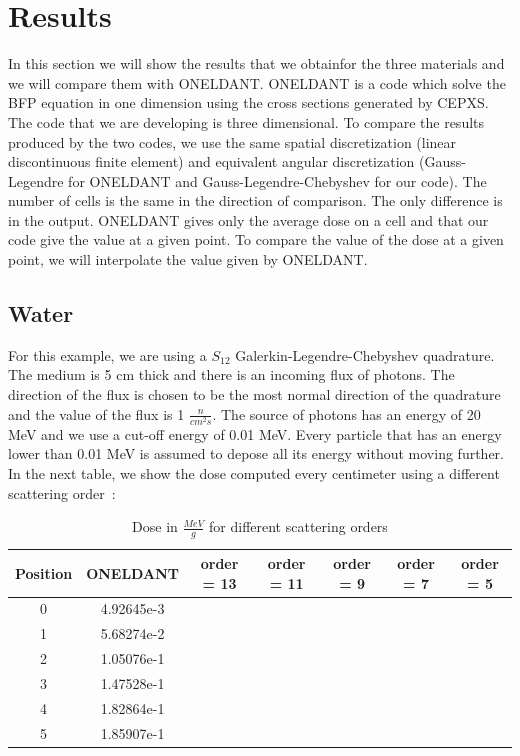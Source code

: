 \section{Results}
In this section we will show the results that we obtainfor the three materials
and we will compare them with ONELDANT\cite{cepxs}. ONELDANT is a code which
solve the BFP equation in one dimension using the cross sections generated by
CEPXS. The code that we are developing is three dimensional. To compare the 
results produced by the two codes, we use the same spatial discretization 
(linear discontinuous finite element) and equivalent angular discretization 
(Gauss-Legendre for ONELDANT and Gauss-Legendre-Chebyshev for our code). 
The number of cells is the same in the direction of comparison. The only 
difference is in the output. ONELDANT gives only the average dose on a cell and 
that our code give the value at a given point. To compare the value of the dose 
at a given point, we will interpolate the value given by ONELDANT.

\subsection{Water}
For this example, we are using a $S_{12}$ Galerkin-Legendre-Chebyshev
quadrature. The medium is 5 cm thick and there is an incoming flux of
photons. The direction of the flux is chosen to be the most normal direction
of the quadrature and the value of the flux is 1 $\frac{n}{cm^2s}$. The source 
of photons has an energy of 20 MeV and we use a cut-off energy of 0.01 MeV. 
Every particle that has an energy lower than 0.01 MeV is assumed to depose 
all its energy without moving further.\\
In the next table, we show the dose computed every centimeter using a
different scattering \hbox{order :}
\begin{table}[H]
\begin{center}
\caption{Dose in $\frac{MeV}{g}$ for different scattering orders}
\begin{tabular}{|c|c|c|c|c|c|c|}
\hline
Position & ONELDANT & order = 13 & order = 11 & order = 9 & order = 7 & order = 5 \\
\hline
0 & 4.92645e-3 &  &  &  &  &  \\
1 & 5.68274e-2 &  &  &  &  &  \\
2 & 1.05076e-1 &  &  &  &  &  \\
3 & 1.47528e-1 &  &  &  &  &  \\
4 & 1.82864e-1 &  &  &  &  &  \\
5 & 1.85907e-1 &  &  &  &  &  \\
\hline
\end{tabular}
\end{center}
\end{table}     

